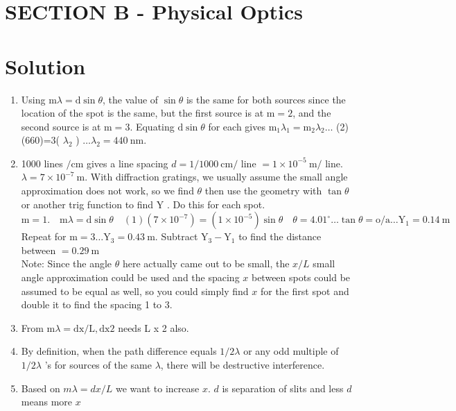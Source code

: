 \begin{enumerate}
\section*{SECTION B - Physical Optics}
\section*{Solution}
\begin{enumerate}
  \item Using $\mathrm{m} \lambda=\mathrm{d} \sin \theta$, the value of $\sin \theta$ is the same for both sources since the location of the spot is the same, but the first source is at $\mathrm{m}=2$, and the second source is at $\mathrm{m}=3$. Equating $\mathrm{d} \sin \theta$ for each gives $\mathrm{m}_{1} \lambda_{1}=\mathrm{m}_{2} \lambda_{2} \ldots$ (2)(660)=3( $\lambda_{2}$ ) $\ldots \lambda_{2}=440 \mathrm{~nm}$.
  \item 1000 lines $/ \mathrm{cm}$ gives a line spacing $d=1 / 1000 \mathrm{~cm} /$ line $=1 \times 10^{-5} \mathrm{~m} /$ line. $\lambda=7 \times 10^{-7} \mathrm{~m}$. With diffraction gratings, we usually assume the small angle approximation does not work, so we find $\theta$ then use the geometry with $\tan \theta$ or another trig function to find Y . Do this for each spot.\\
$\mathrm{m}=1 . \quad \mathrm{m} \lambda=\mathrm{d} \sin \theta \quad(1)\left(7 \times 10^{-7}\right)=\left(1 \times 10^{-5}\right) \sin \theta \quad \theta=4.01^{\circ} \ldots \tan \theta=\mathrm{o} / \mathrm{a} \ldots \mathrm{Y}_{1}=0.14 \mathrm{~m}$\\
Repeat for $\mathrm{m}=3 \ldots \mathrm{Y}_{3}=0.43 \mathrm{~m}$. Subtract $\mathrm{Y}_{3}-\mathrm{Y}_{1}$ to find the distance between $=0.29 \mathrm{~m}$\\
Note: Since the angle $\theta$ here actually came out to be small, the $x / L$ small angle approximation could be used and the spacing $x$ between spots could be assumed to be equal as well, so you could simply find $x$ for the first spot and double it to find the spacing 1 to 3.
  \item From $\mathrm{m} \lambda=\mathrm{dx} / \mathrm{L}, \mathrm{d} \mathrm{x} 2$ needs L x 2 also.
  \item By definition, when the path difference equals $1 / 2 \lambda$ or any odd multiple of $1 / 2 \lambda$ 's for sources of the same $\lambda$, there will be destructive interference.
  \item Based on $m \lambda=d x / L$ we want to increase $x$. $d$ is separation of slits and less $d$ means more $x$

\end{enumerate}
\end{enumerate}
